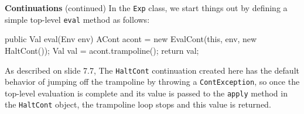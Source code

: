 \begin{minipage}[t]{\sw}
\slidenumber
\LARGE
{\bf Continuations} (continued)\exx
In the \verb'Exp' class,
we start things out by defining
a simple top-level \verb'eval' method as follows:
\Large
\begin{qv}
public Val eval(Env env) {
    ACont acont = new EvalCont(this, env, new HaltCont());
    Val val = acont.trampoline();
    return val;
}
\end{qv}
\LARGE
As described on slide 7.7,
The \verb'HaltCont' continuation created here has the default behavior
of jumping off the trampoline
by throwing a \verb'ContException',
so once the top-level evaluation is complete
and its value is passed to the \verb'apply' method
in the \verb'HaltCont' object,
the trampoline loop stops
and this value is returned.
\end{minipage}
